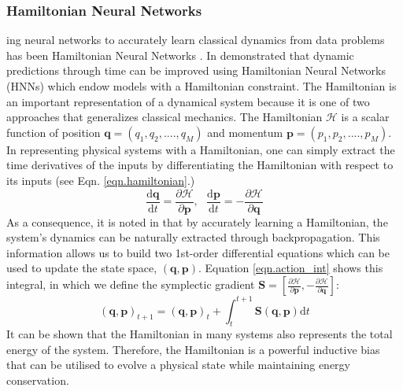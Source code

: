 \documentclass{article}
\begin{document}
\subsubsection{Hamiltonian Neural Networks}
\label{HNN}
ing neural networks to accurately learn classical dynamics from data  problems has been Hamiltonian Neural Networks \cite{greydanus_hamiltonian_2019}. In  demonstrated that dynamic predictions through time can be improved using Hamiltonian Neural Networks (HNNs) which endow models with a Hamiltonian constraint. The Hamiltonian is an important representation of a dynamical system because it is one of two approaches that generalizes classical mechanics. The Hamiltonian $\mathcal{H}$ is a scalar function of position $\mathbf{q} = (q_1,q_2,....,q_M)$ and momentum $\mathbf{p} = (p_1,p_2,....,p_M)$. In representing physical systems with a Hamiltonian, one can simply extract the time derivatives of the inputs by differentiating the Hamiltonian with respect to its inputs (see Eqn. \ref{eqn.hamiltonian}.)
\begin{equation}
\frac{\mathrm{d}\mathbf{q}}{\mathrm{d}t} = \frac{\partial \mathcal{H}}{\partial \mathbf{p}}, ~~~
\frac{\mathrm{d}\mathbf{p}}{\mathrm{d}t} = -\frac{\partial \mathcal{H}}{\partial \mathbf{q}}
\label{eqn.hamiltonian}
\end{equation}
As a consequence, it is noted in \cite{greydanus_hamiltonian_2019} that by accurately learning a Hamiltonian, the system's dynamics can be naturally extracted through backpropagation. This information allows us to build two 1st-order differential equations which can be used to update the state space, $(\mathbf{q},\mathbf{p})$. Equation \ref{eqn.action_int} shows this integral, in which we define the symplectic gradient $\mathbf{S}  = \left [ \frac{\partial \mathcal{H}}{\partial \mathbf{p}},-\frac{\partial \mathcal{H}}{\partial \mathbf{q}} \right ] $:
\begin{equation}
(\mathbf{q},\mathbf{p})_{t+1} = (\mathbf{q},\mathbf{p})_t + \int_t^{t+1} \mathbf{S}(\mathbf{q},\mathbf{p}) \mathrm{d}t
\label{eqn.action_int}
\end{equation}
It can be shown that the Hamiltonian in many systems also represents the total energy of the system. Therefore, the Hamiltonian is a powerful inductive bias that can be utilised to evolve a physical state while maintaining energy conservation.
\end{document}
